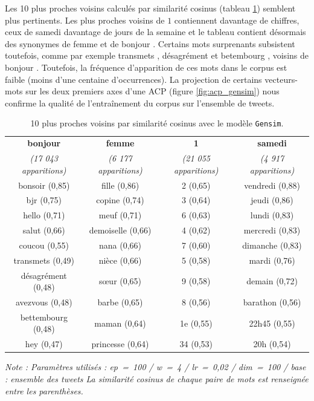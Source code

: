 \documentclass[11pt,french,french]{article}
\begin{document}
Les 10 plus proches voisins calculés par similarité cosinus (tableau
\ref{table:knn_gensim}) semblent plus pertinents. Les plus proches
voisins de \og \(1\) \fg contiennent davantage de chiffres, ceux de
\og samedi \fg davantage de jours de la semaine et le tableau contient
désormais des synonymes de \og femme \fg et de \og bonjour \fg. Certains
mots surprenants subsistent toutefois, comme par exemple \og transmets
\fg{}, \og désagrément \fg{} et \og betembourg \fg{}, voisins de
\og bonjour \fg{}. Toutefois, la fréquence d'apparition de ces mots dans
le corpus est faible (moins d'une centaine d'occurrences). La projection
de certains vecteurs-mots sur les deux premiers axes d'une ACP (figure
\ref{fig:acp_gensim}) nous confirme la qualité de l'entraînement du
corpus sur l'ensemble de tweets.

\begin{table}[h]
\begin{center}
\begin{tabular}{|c|c|c|c|}
    \hline
\textbf{bonjour} & \textbf{femme} & \textbf{1} & \textbf{samedi} \tabularnewline
\emph{(17 043 apparitions)} & \emph{(6 177 apparitions)} & \emph{(21 055 apparitions)} & \emph{(4 917 apparitions)} \tabularnewline
       \hline
bonsoir (0,85) & fille (0,86) & 2 (0,65) & vendredi (0,88) \tabularnewline
bjr (0,75) & copine (0,74) & 3 (0,64) & jeudi (0,86) \tabularnewline
hello (0,71) & meuf (0,71) & 6 (0,63) & lundi (0,83) \tabularnewline
salut (0,66) & demoiselle (0,66) & 4 (0,62) & mercredi (0,83) \tabularnewline
coucou (0,55) & nana (0,66) & 7 (0,60) & dimanche (0,83) \tabularnewline
transmets (0,49) & nièce (0,66) & 5 (0,58) & mardi (0,76) \tabularnewline
désagrément (0,48) & sœur (0,65) & 9 (0,58) & demain (0,72) \tabularnewline
avezvous (0,48) & barbe (0,65) & 8 (0,56) & barathon (0,56) \tabularnewline
bettembourg (0,48) & maman (0,64) & 1e (0,55) & 22h45 (0,55) \tabularnewline
hey (0,47) & princesse (0,64) & 34 (0,53) & 20h (0,54) \tabularnewline
    \hline
 \end{tabular}
\captionsetup{margin=0cm,format=hang,justification=justified}
\caption{10 plus proches voisins par similarité cosinus avec le modèle \texttt{Gensim}.}\label{table:knn_gensim}
\end{center}
\vspace{-0.3cm}
\footnotesize
\emph{Note : Paramètres utilisés : ep = 100 / w = 4 / lr = 0,02 / dim = 100 / base : ensemble des tweets\newline
La similarité cosinus de chaque paire de mots est renseignée entre les parenthèses.}
\end{table}
\end{document}
